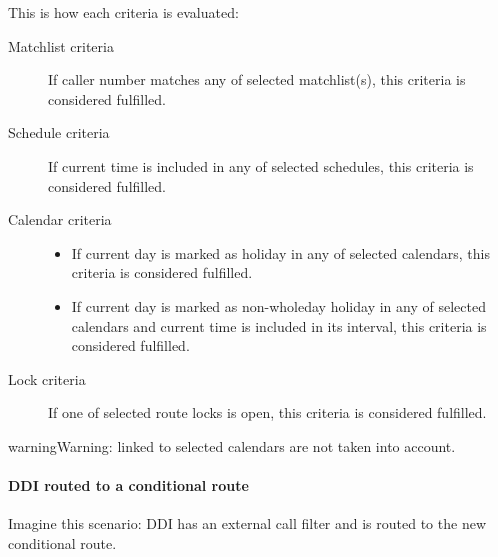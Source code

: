 \documentclass[letterpaper,10pt,english]{sphinxmanual}
\begin{document}
This is how each criteria is evaluated:
\begin{description}
\item[{Matchlist criteria}] \leavevmode{}\label{administration_portal/client/vpbx/routing_endpoints/conditional_routes:term-matchlist-criteria}
If caller number matches any of selected matchlist(s), this criteria is considered fulfilled.

\item[{Schedule criteria}] \leavevmode{}\label{administration_portal/client/vpbx/routing_endpoints/conditional_routes:term-schedule-criteria}
If current time is included in any of selected schedules, this criteria is considered fulfilled.

\item[{Calendar criteria}] \leavevmode{}\label{administration_portal/client/vpbx/routing_endpoints/conditional_routes:term-calendar-criteria}\begin{itemize}
\item {} 
If current day is marked as holiday in any of selected calendars, this criteria is considered fulfilled.

\item {} 
If current day is marked as non-wholeday holiday in any of selected calendars and current time is included
in its interval, this criteria is considered fulfilled.

\end{itemize}

\item[{Lock criteria}] \leavevmode{}\label{administration_portal/client/vpbx/routing_endpoints/conditional_routes:term-lock-criteria}
If one of selected route locks is open, this criteria is considered fulfilled.

\end{description}

\begin{notice}{warning}{Warning:}
{\hyperref[administration_portal/client/vpbx/routing_tools/calendars:calendar\string-periods]{}} linked to selected calendars are not taken into account.
\end{notice}


\paragraph{DDI routed to a conditional route}
\label{administration_portal/client/vpbx/routing_endpoints/conditional_routes:ddi-routed-to-a-conditional-route}
Imagine this scenario: DDI has an external call filter and is routed to the new conditional route.
\end{document}
